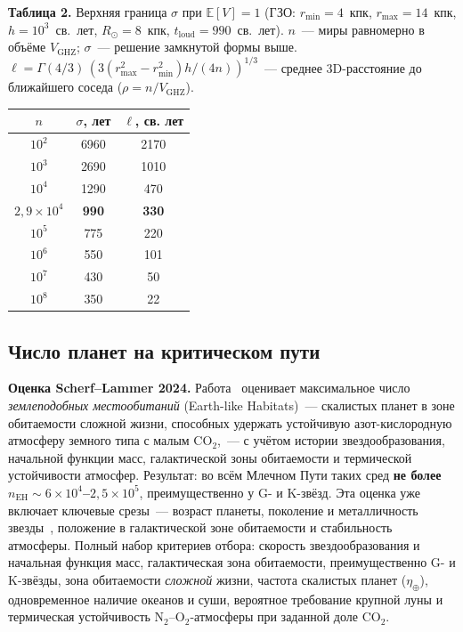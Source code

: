 \documentclass[12pt,a4paper]{article}
\begin{document}
\begin{center}
\textbf{Таблица 2.} Верхняя граница $\sigma$ при $\mathbb{E}[V]=1$ (ГЗО: $r_{\min}=4$~кпк, $r_{\max}=14$~кпк, $h = 10^3$~св.~лет, $R_\odot=8$~кпк, $t_{\mathrm{loud}} = 990$~св.~лет). $n$~--- миры равномерно в объёме $V_{\mathrm{GHZ}}$; $\sigma$~--- решение замкнутой формы выше. $\ell = \Gamma(4/3)\,(3(r_{\max}^2-r_{\min}^2)h/(4n))^{1/3}$~--- среднее 3D-расстояние до ближайшего соседа ($\rho = n/V_{\mathrm{GHZ}}$).

\medskip
\small
\begin{tabular}{c c c}
\hline
$n$ & $\sigma$, лет & $\ell$, св. лет \\
\hline
$10^2$ & 6960 & 2170 \\
$10^3$ & 2690 & 1010 \\
$10^4$ & 1290 & 470 \\
\textbf{$2{,}9 \times 10^4$} & \textbf{990} & \textbf{330} \\
$10^5$ & 775 & 220 \\
$10^6$ & 550 & 101 \\
$10^7$ & 430 & 50 \\
$10^8$ & 350 & 22 \\
\hline
\end{tabular}
\normalsize
\end{center}

\subsection{Число планет на критическом пути}
\label{sec:kepler}

\textbf{Оценка Scherf--Lammer 2024.} Работа~\cite{Scherf2024,Lammer2024} оценивает максимальное число \emph{землеподобных местообитаний} (Earth-like Habitats)~--- скалистых планет в зоне обитаемости сложной жизни, способных удержать устойчивую азот-кислородную атмосферу земного типа с малым $\mathrm{CO_2}$,~--- с учётом истории звездообразования, начальной функции масс, галактической зоны обитаемости и термической устойчивости атмосфер. Результат: во всём Млечном Пути таких сред \textbf{не более $n_{\text{EH}} \sim 6\times10^4$--$2{,}5\times10^5$}, преимущественно у G- и K-звёзд. Эта оценка уже включает ключевые срезы~--- возраст планеты, поколение и металличность звезды~\cite{Lineweaver2001,Behroozi2015}, положение в галактической зоне обитаемости и стабильность атмосферы. Полный набор критериев отбора: скорость звездообразования и начальная функция масс, галактическая зона обитаемости, преимущественно G- и K-звёзды, зона обитаемости \emph{сложной} жизни, частота скалистых планет ($\eta_\oplus$), одновременное наличие океанов и суши, вероятное требование крупной луны и термическая устойчивость N$_2$--O$_2$-атмосферы при заданной доле CO$_2$.
\end{document}
